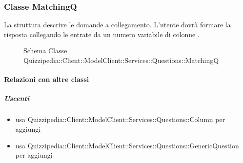 \subsubsection{Classe MatchingQ}
La struttura descrive le domande a collegamento. L'utente dovrà formare la risposta collegando le entrate da un numero variabile di colonne .
\begin{figure}[H]
\centering
\noindent{}
\caption[Schema Classe MatchingQ]{Schema Classe Quizzipedia::Client::ModelClient::Services::Questions::MatchingQ}
\end{figure}
\paragraph{Relazioni con altre classi}
\subparagraph{Uscenti}
\begin{itemize}
\item usa Quizzipedia::Client::ModelClient::Services::Questions::Column per aggiungi
\item usa Quizzipedia::Client::ModelClient::Services::Questions::GenericQuestion per aggiungi
\end{itemize}
